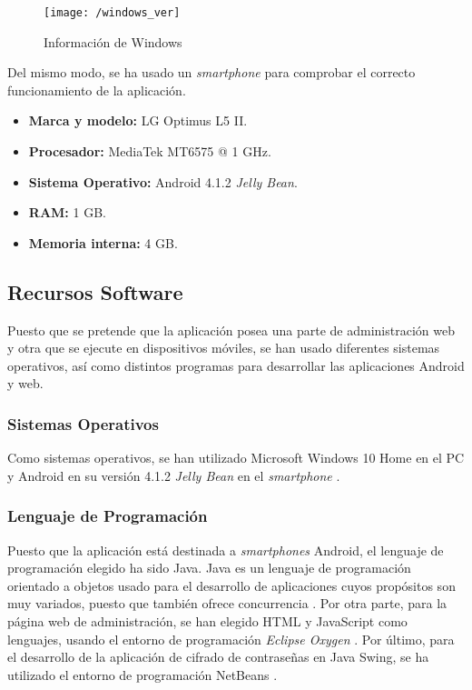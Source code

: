 \begin{figure}[!h]
	\begin{center}
		\texttt{[image: /windows\_ver]}
		\caption{Información de Windows}
		\label{fig:winver}
	\end{center}
\end{figure}

Del mismo modo, se ha usado un \textit{smartphone} para comprobar el correcto funcionamiento de la aplicación.

\begin{itemize}
	\item \textbf{Marca y modelo:} LG Optimus L5 II.
	\item \textbf{Procesador:} MediaTek MT6575 @ 1 \acs{GHz}.
	\item \textbf{Sistema Operativo:} Android 4.1.2 \textit{Jelly Bean}.
	\item \textbf{RAM:} 1 \acs{GB}.
	\item \textbf{Memoria interna:} 4 \acs{GB}.
\end{itemize}

\clearpage

\subsection{Recursos Software}
Puesto que se pretende que la aplicación posea una parte de administración web y otra que se ejecute en dispositivos móviles, se han usado diferentes sistemas operativos, así como distintos programas para desarrollar las aplicaciones Android y web.

\subsubsection*{Sistemas Operativos}
Como sistemas operativos, se han utilizado Microsoft Windows 10 Home \cite{Microsoft} en el PC y Android en su versión 4.1.2 \textit{Jelly Bean} en el \textit{smartphone} \cite{Andro}.

\subsubsection*{Lenguaje de Programación}
Puesto que la aplicación está destinada a \textit{smartphones} Android, el lenguaje de programación elegido ha sido Java. Java es un lenguaje de programación orientado a objetos usado para el desarrollo de aplicaciones cuyos propósitos son muy variados, puesto que también ofrece concurrencia \cite{Java}. Por otra parte, para la página web de administración, se han elegido \acs{HTML} y JavaScript como lenguajes, usando el entorno de programación \textit{Eclipse Oxygen} \cite{EclipseFoundation2018}. Por último, para el desarrollo de la aplicación de cifrado de contraseñas en Java Swing, se ha utilizado el entorno de programación NetBeans \cite{NetBeans2018}.


